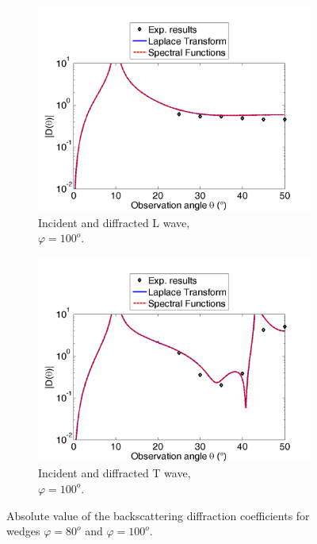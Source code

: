 \begin{figure}[h!]
     \begin{subfigure}[b]{0.49\textwidth}
        \includegraphics[width=\textwidth]{images/chapter3/Retrodiff_D_100_LL.png}
        \caption{Incident and diffracted L wave, \\ $\varphi=100^o$.}
        \label{C3:DLL100}
    \end{subfigure}
    \hfill
    \begin{subfigure}[b]{0.49\textwidth}
        \includegraphics[width=\textwidth]{images/chapter3/Retrodiff_D_100_TT.png}
        \caption{Incident and diffracted T wave, \\ $\varphi=100^o$.}
        \label{C3:DTT100}
     \end{subfigure}
     \caption{Absolute value of the backscattering diffraction coefficients for wedges $\varphi=80^o$ and $\varphi=100^o$.}
     \label{C3:expcoeffs}
\end{figure}

